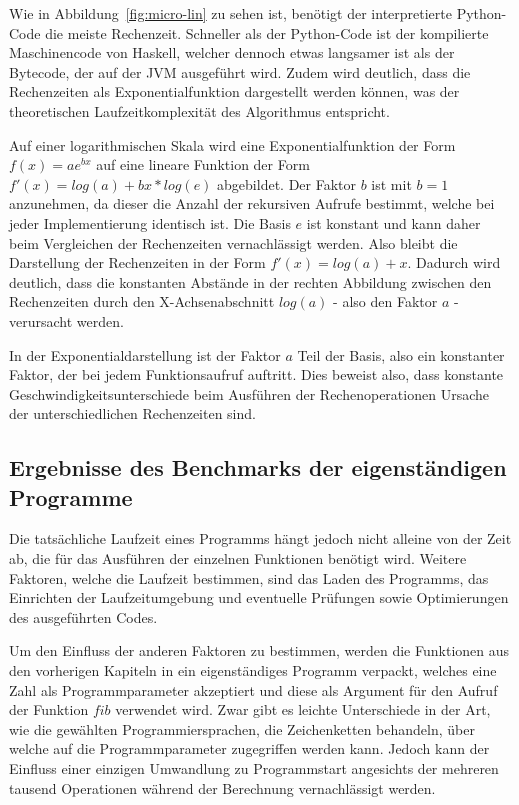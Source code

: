 \documentclass[11pt, parskip=half]{scrartcl}       %
\begin{document}
Wie in Abbildung~\ref{fig:micro-lin} zu sehen ist, benötigt der interpretierte Python-Code die meiste Rechenzeit.
Schneller als der Python-Code ist der kompilierte Maschinencode von Haskell, welcher dennoch etwas langsamer ist als der Bytecode, der auf der JVM ausgeführt wird.
Zudem wird deutlich, dass die Rechenzeiten als Exponentialfunktion dargestellt werden können, was der theoretischen Laufzeitkomplexität des Algorithmus entspricht.

Auf einer logarithmischen Skala wird eine Exponentialfunktion der Form $f(x) = ae^{bx}$ auf eine lineare Funktion der Form $f'(x) = log(a) + bx * log(e)$ abgebildet.
Der Faktor $b$ ist mit $b = 1$ anzunehmen, da dieser die Anzahl der rekursiven Aufrufe bestimmt, welche bei jeder Implementierung identisch ist.
Die Basis $e$ ist konstant und kann daher beim Vergleichen der Rechenzeiten vernachlässigt werden.
Also bleibt die Darstellung der Rechenzeiten in der Form $f'(x) = log(a) + x$.
Dadurch wird deutlich, dass die konstanten Abstände in der rechten Abbildung zwischen den Rechenzeiten durch den X-Achsenabschnitt $log(a)$ - also den Faktor $a$ - verursacht werden.

In der Exponentialdarstellung ist der Faktor $a$ Teil der Basis, also ein konstanter Faktor, der bei jedem Funktionsaufruf auftritt.
Dies beweist also, dass konstante Geschwindigkeitsunterschiede beim Ausführen der Rechenoperationen Ursache der unterschiedlichen Rechenzeiten sind.

\subsection{Ergebnisse des Benchmarks der eigenständigen Programme}

Die tatsächliche Laufzeit eines Programms hängt jedoch nicht alleine von der Zeit ab, die für das Ausführen der einzelnen Funktionen benötigt wird.
Weitere Faktoren, welche die Laufzeit bestimmen, sind das Laden des Programms, das Einrichten der Laufzeitumgebung und eventuelle Prüfungen sowie Optimierungen des ausgeführten Codes.

Um den Einfluss der anderen Faktoren zu bestimmen, werden die Funktionen aus den vorherigen Kapiteln in ein eigenständiges Programm verpackt, welches eine Zahl als Programmparameter akzeptiert und diese als Argument für den Aufruf der Funktion $fib$ verwendet wird.
Zwar gibt es leichte Unterschiede in der Art, wie die gewählten Programmiersprachen, die Zeichenketten behandeln, über welche auf die Programmparameter zugegriffen werden kann.
Jedoch kann der Einfluss einer einzigen Umwandlung zu Programmstart angesichts der mehreren tausend Operationen während der Berechnung vernachlässigt werden.
\end{document}

